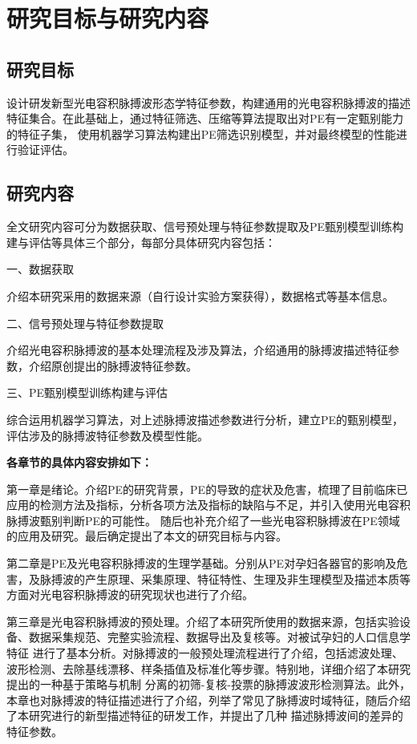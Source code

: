 \section{研究目标与研究内容}

\subsection{研究目标}
设计研发新型光电容积脉搏波形态学特征参数，构建通用的光电容积脉搏波的描述特征集合。在此基础上，通过特征筛选、压缩等算法提取出对PE有一定甄别能力的特征子集，
使用机器学习算法构建出PE筛选识别模型，并对最终模型的性能进行验证评估。
\subsection{研究内容}
全文研究内容可分为数据获取、信号预处理与特征参数提取及PE甄别模型训练构建与评估等具体三个部分，每部分具体研究内容包括：

一、数据获取

介绍本研究采用的数据来源（自行设计实验方案获得），数据格式等基本信息。

二、信号预处理与特征参数提取

介绍光电容积脉搏波的基本处理流程及涉及算法，介绍通用的脉搏波描述特征参数，介绍原创提出的脉搏波特征参数。

三、PE甄别模型训练构建与评估

综合运用机器学习算法，对上述脉搏波描述参数进行分析，建立PE的甄别模型，评估涉及的脉搏波特征参数及模型性能。

\textbf{各章节的具体内容安排如下：}

第一章是绪论。介绍PE的研究背景，PE的导致的症状及危害，梳理了目前临床已应用的检测方法及指标，分析各项方法及指标的缺陷与不足，并引入使用光电容积脉搏波甄别判断PE的可能性。
随后也补充介绍了一些光电容积脉搏波在PE领域的应用及研究。最后确定提出了本文的研究目标与内容。

第二章是PE及光电容积脉搏波的生理学基础。分别从PE对孕妇各器官的影响及危害，及脉搏波的产生原理、采集原理、特征特性、生理及非生理模型及描述本质等方面对光电容积脉搏波的研究现状也进行了介绍。

第三章是光电容积脉搏波的预处理。介绍了本研究所使用的数据来源，包括实验设备、数据采集规范、完整实验流程、数据导出及复核等。对被试孕妇的人口信息学特征
进行了基本分析。对脉搏波的一般预处理流程进行了介绍，包括滤波处理、波形检测、去除基线漂移、样条插值及标准化等步骤。特别地，详细介绍了本研究提出的一种基于策略与机制
分离的初筛-复核-投票的脉搏波波形检测算法。此外，本章也对脉搏波的特征描述进行了介绍，列举了常见了脉搏波时域特征，随后介绍了本研究进行的新型描述特征的研发工作，并提出了几种
描述脉搏波间的差异的特征参数。

